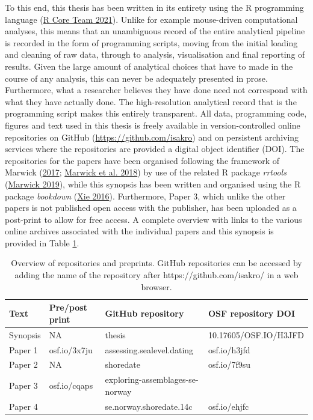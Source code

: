 \documentclass[
  12pt,
  a4paper,
  oneside]{book}
\begin{document}
To this end, this thesis has been written in its entirety using the R programming language (\protect\hyperlink{ref-rcoreteam2021}{R Core Team 2021}). Unlike for example mouse-driven computational analyses, this means that an unambiguous record of the entire analytical pipeline is recorded in the form of programming scripts, moving from the initial loading and cleaning of raw data, through to analysis, visualisation and final reporting of results. Given the large amount of analytical choices that have to made in the course of any analysis, this can never be adequately presented in prose. Furthermore, what a researcher believes they have done need not correspond with what they have actually done. The high-resolution analytical record that is the programming script makes this entirely transparent. All data, programming code, figures and text used in this thesis is freely available in version-controlled online repositories on GitHub (\url{https://github.com/isakro}) and on persistent archiving services where the repositories are provided a digital object identifier (DOI). The repositories for the papers have been organised following the framework of Marwick (\protect\hyperlink{ref-marwick2017}{2017}; \protect\hyperlink{ref-marwick2018}{Marwick et al. 2018}) by use of the related R package \emph{rrtools} (\protect\hyperlink{ref-marwick2019}{Marwick 2019}), while this synopsis has been written and organised using the R package \emph{bookdown} (\protect\hyperlink{ref-xie2016}{Xie 2016}). Furthermore, Paper 3, which unlike the other papers is not published open access with the publisher, has been uploaded as a post-print to allow for free access. A complete overview with links to the various online archives associated with the individual papers and this synopsis is provided in Table \ref{tab:op}.

\begin{table}

\caption{\label{tab:op}Overview of repositories and preprints. GitHub repositories can be accessed by adding the name of the repository after https://github.com/isakro/ in a web browser.}
\centering
\begin{tabular}[t]{llll}
\toprule
Text & Pre/post print & GitHub repository & OSF repository DOI\\
\midrule
Synopsis & NA & thesis & 10.17605/OSF.IO/H3JFD\\
Paper 1 & osf.io/3x7ju & assessing.sealevel.dating & osf.io/h3jfd\\
Paper 2 & NA & shoredate & osf.io/7f9su\\
Paper 3 & osf.io/cqaps & exploring-assemblages-se-norway & \\
Paper 4 &  & se.norway.shoredate.14c & osf.io/ehjfc\\
\bottomrule
\end{tabular}
\end{table}
\end{document}
